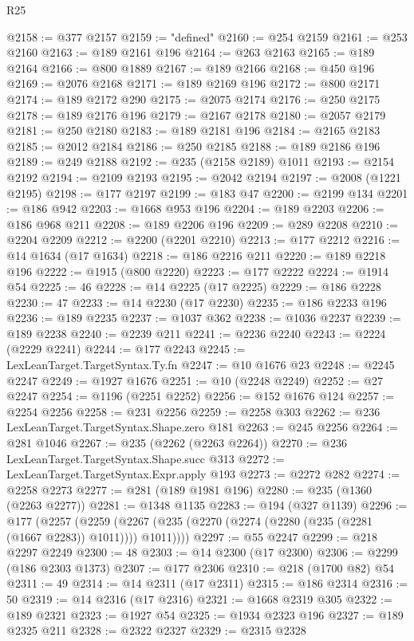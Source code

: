 \begin{lexlean}{R25}
\begin{coremodule}
@2158 := @377 @2157
@2159 := "defined"
@2160 := @254 @2159
@2161 := @253 @2160
@2163 := @189 @2161 @196
@2164 := @263 @2163
@2165 := @189 @2164
@2166 := @800 @1889
@2167 := @189 @2166
@2168 := @450 @196
@2169 := @2076 @2168
@2171 := @189 @2169 @196
@2172 := @800 @2171
@2174 := @189 @2172 @290
@2175 := @2075 @2174
@2176 := @250 @2175
@2178 := @189 @2176 @196
@2179 := @2167 @2178
@2180 := @2057 @2179
@2181 := @250 @2180
@2183 := @189 @2181 @196
@2184 := @2165 @2183
@2185 := @2012 @2184
@2186 := @250 @2185
@2188 := @189 @2186 @196
@2189 := @249 @2188
@2192 := @235 (@2158 @2189) @1011
@2193 := @2154 @2192
@2194 := @2109 @2193
@2195 := @2042 @2194
@2197 := @2008 (@1221 @2195)
@2198 := @177 @2197
@2199 := @183 @47
@2200 := @2199 @134
@2201 := @186 @942
@2203 := @1668 @953 @196
@2204 := @189 @2203
@2206 := @186 @968 @211
@2208 := @189 @2206 @196
@2209 := @289 @2208
@2210 := @2204 @2209
@2212 := @2200 (@2201 @2210)
@2213 := @177 @2212
@2216 := @14 @1634 (@17 @1634)
@2218 := @186 @2216 @211
@2220 := @189 @2218 @196
@2222 := @1915 (@800 @2220)
@2223 := @177 @2222
@2224 := @1914 @54
@2225 := 46
@2228 := @14 @2225 (@17 @2225)
@2229 := @186 @2228
@2230 := 47
@2233 := @14 @2230 (@17 @2230)
@2235 := @186 @2233 @196
@2236 := @189 @2235
@2237 := @1037 @362
@2238 := @1036 @2237
@2239 := @189 @2238
@2240 := @2239 @211
@2241 := @2236 @2240
@2243 := @2224 (@2229 @2241)
@2244 := @177 @2243
@2245 := LexLeanTarget.TargetSyntax.Ty.fn
@2247 := @10 @1676 @23
@2248 := @2245 @2247
@2249 := @1927 @1676
@2251 := @10 (@2248 @2249)
@2252 := @27 @2247
@2254 := @1196 (@2251 @2252)
@2256 := @152 @1676 @124
@2257 := @2254 @2256
@2258 := @231 @2256
@2259 := @2258 @303
@2262 := @236 LexLeanTarget.TargetSyntax.Shape.zero @181
@2263 := @245 @2256
@2264 := @281 @1046
@2267 := @235 (@2262 (@2263 @2264))
@2270 := @236 LexLeanTarget.TargetSyntax.Shape.succ @313
@2272 := LexLeanTarget.TargetSyntax.Expr.apply @193
@2273 := @2272 @282
@2274 := @2258 @2273
@2277 := @281 (@189 @1981 @196)
@2280 := @235 (@1360 (@2263 @2277))
@2281 := @1348 @1135
@2283 := @194 (@327 @1139)
@2296 := @177
    (@2257 (@2259 (@2267 (@235 (@2270 (@2274 (@2280 (@235 (@2281 (@1667 @2283)) @1011)))) @1011))))
@2297 := @55 @2247
@2299 := @218 @2297 @2249
@2300 := 48
@2303 := @14 @2300 (@17 @2300)
@2306 := @2299 (@186 @2303 @1373)
@2307 := @177 @2306
@2310 := @218 (@1700 @82) @54
@2311 := 49
@2314 := @14 @2311 (@17 @2311)
@2315 := @186 @2314
@2316 := 50
@2319 := @14 @2316 (@17 @2316)
@2321 := @1668 @2319 @305
@2322 := @189 @2321
@2323 := @1927 @54
@2325 := @1934 @2323 @196
@2327 := @189 @2325 @211
@2328 := @2322 @2327
@2329 := @2315 @2328

\end{coremodule}
\end{lexlean}
